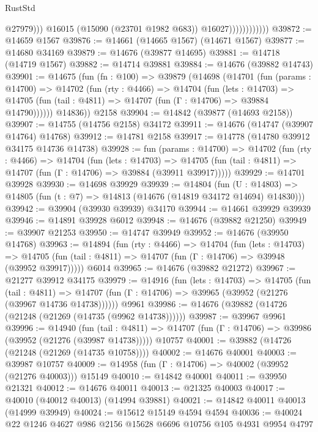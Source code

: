 \begin{lexlean}{RustStd}
\begin{coremodule}
                                  @27979)))
                            @16015
                            (@15090 (@23701 @1982 @683))
                            @16027))))))))))))
@39872 := @14659 @1567
@39876 := @14661 (@14665 @1567) (@14671 @1567)
@39877 := @14680 @34169
@39879 := @14676 (@39877 @14695)
@39881 := @14718 (@14719 @1567)
@39882 := @14714 @39881
@39884 := @14676 (@39882 @14743)
@39901 := @14675
    (fun (fn : @100) =>
    @39879
      (@14698
        (@14701
          (fun (params : @14700) =>
          @14702
            (fun (rty : @4466) =>
            @14704
              (fun (lets : @14703) =>
              @14705 (fun (tail : @4811) => @14707 (fun (Γ : @14706) => @39884 @14790))))))
        @14836))
    @2158
@39904 := @14842 (@39877 (@14693 @2158))
@39907 := @14755 (@14756 @2158) @34172
@39911 := @14676 (@14747 (@39907 @14764) @14768)
@39912 := @14781 @2158
@39917 := @14778 (@14780 @39912 @34175 @14736 @14738)
@39928 := fun (params : @14700) =>
  @14702
    (fun (rty : @4466) =>
    @14704
      (fun (lets : @14703) =>
      @14705 (fun (tail : @4811) => @14707 (fun (Γ : @14706) => @39884 (@39911 @39917)))))
@39929 := @14701 @39928
@39930 := @14698 @39929
@39939 := @14804
    (fun (U : @14803) => @14805 (fun (t : @7) => @14813 (@14676 (@14819 @34172 @14694) @14830)))
@39942 := @39904 (@39930 @39939) @34170
@39944 := @14661 @39929 @39939
@39946 := @14891 @39928 @6012
@39948 := @14676 (@39882 @21250)
@39949 := @39907 @21253
@39950 := @14747 @39949
@39952 := @14676 (@39950 @14768)
@39963 := @14894
    (fun (rty : @4466) =>
    @14704
      (fun (lets : @14703) =>
      @14705 (fun (tail : @4811) => @14707 (fun (Γ : @14706) => @39948 (@39952 @39917)))))
    @6014
@39965 := @14676 (@39882 @21272)
@39967 := @21277 @39912 @34175
@39979 := @14916
    (fun (lets : @14703) =>
    @14705
      (fun (tail : @4811) =>
      @14707 (fun (Γ : @14706) => @39965 (@39952 (@21276 (@39967 @14736 @14738))))))
    @9961
@39986 := @14676 (@39882 (@14726 (@21248 (@21269 (@14735 (@9962 @14738))))))
@39987 := @39967 @9961
@39996 := @14940
    (fun (tail : @4811) => @14707 (fun (Γ : @14706) => @39986 (@39952 (@21276 (@39987 @14738)))))
    @10757
@40001 := @39882 (@14726 (@21248 (@21269 (@14735 @10758))))
@40002 := @14676 @40001
@40003 := @39987 @10757
@40009 := @14958 (fun (Γ : @14706) => @40002 (@39952 (@21276 @40003))) @15149
@40010 := @14842 @40001
@40011 := @39950 @21321
@40012 := @14676 @40011
@40013 := @21325 @40003
@40017 := @40010 (@40012 @40013) (@14994 @39881)
@40021 := @14842 @40011 @40013 (@14999 @39949)
@40024 := @15612 @15149 @4594 @4594
@40036 := @40024 @22 @1246 @4627 @986 @2156 @15628 @6696 @10756 @105 @4931 @9954 @4797

\end{coremodule}
\end{lexlean}
